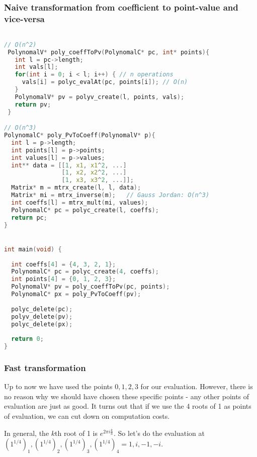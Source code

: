 \subsubsection{Naive transformation from coefficient to point-value and vice-versa}
\begin{lstlisting}[language=c]

// O(n^2)
 PolynomalV* poly_coeffToPv(PolynomalC* pc, int* points){
   int l = pc->length;
   int vals[l];
   for(int i = 0; i < l; i++) { // n operations
     vals[i] = polyc_evalAt(pc, points[i]); // O(n)
   }
   PolynomalV* pv = polyv_create(l, points, vals);
   return pv;
 }

// O(n^3)
PolynomalC* poly_PvToCoeff(PolynomalV* p){
  int l = p->length;
  int points[l] = p->points;
  int values[l] = p->values;
  int** data = [[1, x1, x1^2, ...]
                [1, x2, x2^2, ...]
                [1, x3, x3^2, ...]];
  Matrix* m = mtrx_create(l, l, data);
  Matrix* mi = mtrx_inverse(m);   // Gauss Jordan: O(n^3)
  int coeffs[l] = mtrx_mult(mi, values);
  PolynomalC* pc = polyc_create(l, coeffs);
  return pc;
}


int main(void) {
  
  int coeffs[4] = {4, 3, 2, 1};
  PolynomalC* pc = polyc_create(4, coeffs);
  int points[4] = {0, 1, 2, 3};
  PolynomalV* pv = poly_coeffToPv(pc, points);
  PolynomalC* px = poly_PvToCoeff(pv);
  
  polyc_delete(pc);
  polyv_delete(pv);
  polyc_delete(px);
  
  return 0;
}
\end{lstlisting}

\subsubsection{Fast transformation}
Up to now we have used the points $0, 1, 2, 3$ for our evaluation. However, there is no reason why we should have chosen these specific points - any other points of evaluation are just as good. It turns out that if we use the 4 roots of 1 as points of evaluation, we can cut down on computation costs.

In general, the $k$th root of 1 is $e^{2 \pi i \frac{k}{n} }$. So let's do the evaluation at $(1^{1/4})_1, (1^{1/4})_2, (1^{1/4})_3, (1^{1/4})_4 = 1, i, -1, -i$.



